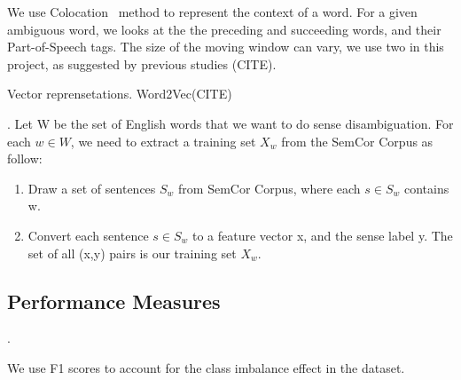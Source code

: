 We use Colocation~\cite{colocation} method to represent the context of a word.
For a given ambiguous word, we looks at the the preceding and succeeding words,
and their Part-of-Speech tags.
The size of the moving window can vary, we use two in this project, as suggested
by previous studies (CITE).
\begin{equation}
  [w_{i-2},POS_{i-2},w_{i-1},POS_{i-1},w_{i+1},POS_{i+1},w_{i+1},POS_{i+1}]
\end{equation}

Vector reprensetations.
Word2Vec(CITE)

.
Let W be the set of English words that we want to do sense disambiguation. For
each $w \in W$, we need to extract a training set $X_w$ from the SemCor Corpus
as follow: 
\begin{enumerate}
  \item Draw a set of sentences $S_w$ from SemCor Corpus, where each 
$s \in S_w$ contains w. 
  \item Convert each sentence $s \in S_w$ to a feature vector x, and the sense
    label y. The set of all (x,y) pairs is our training set $X_w$.
\end{enumerate}

\subsection{Performance Measures}. 

We use F1 scores to account for the class imbalance effect in the dataset.
